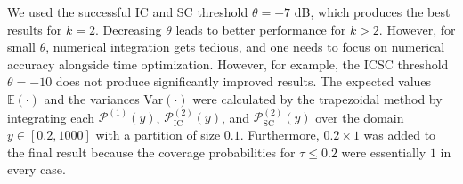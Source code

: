 \documentclass[lettersize,journal]{IEEEtran}
\begin{document}
We used the successful IC and SC threshold $\theta = -7$ dB, which produces the best results for $k=2$. Decreasing $\theta$ leads to better performance for $k>2$. However, for small $\theta$, numerical integration gets tedious, and one needs to focus on numerical accuracy alongside time optimization. However, for example, the ICSC threshold  $\theta = -10$ does not produce significantly improved results. The expected values $\mathbb{E}(\cdot)$ and the variances Var$(\cdot)$  were calculated by the trapezoidal method by integrating each $\mathcal{P}^{(1)}(y)$, $\mathcal{P}^{(2)}_{\text{IC}}(y)$, and $\mathcal{P}^{(2)}_{\text{SC}}(y)$ over the domain $y \in [0.2, 1000]$ with a partition of size $0.1$. Furthermore, $0.2 \times 1$ was added to the final result because the coverage probabilities for $\tau \leq 0.2$ were essentially $1$ in every case. 







%

\end{document}
